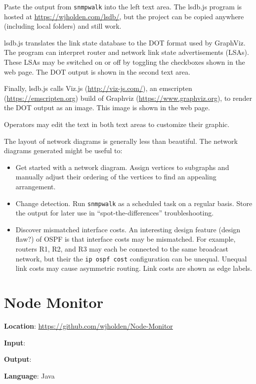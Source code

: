 \documentclass[12pt]{article}
\begin{document}
Paste the output from \texttt{snmpwalk} into the left text area. The lsdb.js program is hosted at \url{https://wjholden.com/lsdb/}, but the project can be copied anywhere (including local folders) and still work.

lsdb.js translates the link state database to the DOT format used by GraphViz. The program can interpret router and network link state advertisements (LSAs). These LSAs may be switched on or off by toggling the checkboxes shown in the web page. The DOT output is shown in the second text area.

Finally, lsdb.js calls Viz.js (\url{http://viz-js.com/}), an emscripten (\url{https://emscripten.org}) build of Graphviz (\url{https://www.graphviz.org}), to render the DOT output as an image. This image is shown in the web page.

Operators may edit the text in both text areas to customize their graphic.

The layout of network diagrams is generally less than beautiful. The network diagrams generated might be useful to:

\begin{itemize}
	\item Get started with a network diagram. Assign vertices to subgraphs and manually adjust their ordering of the vertices to find an appealing arrangement.
	\item Change detection. Run \texttt{snmpwalk} as a scheduled task on a regular basis. Store the output for later use in ``spot-the-differences'' troubleshooting.
	\item Discover mismatched interface costs. An interesting design feature (design flaw?) of OSPF is that interface costs may be mismatched. For example, routers R1, R2, and R3 may each be connected to the same broadcast network, but their the \texttt{ip ospf cost} configuration can be unequal. Unequal link costs may cause asymmetric routing. Link costs are shown as edge labels.	
\end{itemize}

\section{Node Monitor}

\textbf{Location}: \url{https://github.com/wjholden/Node-Monitor}

\textbf{Input}: 

\textbf{Output}: 

\textbf{Language}: Java
\end{document}
